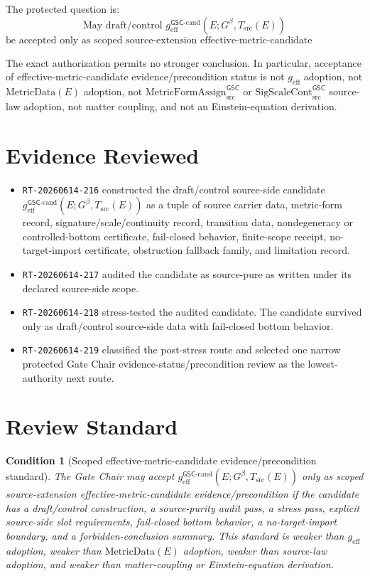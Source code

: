 \documentclass[11pt]{article}
\newcommand{\Gbeta}{G^\beta}
\newcommand{\SigScaleCont}{\mathrm{SigScaleCont}^{\mathsf{GSC}}_{\mathrm{src}}}
\newcommand{\MetricFormAssign}{\mathrm{MetricFormAssign}^{\mathsf{GSC}}_{\mathrm{src}}}
\newcommand{\geff}{g_{\mathrm{eff}}}
\newcommand{\geffCand}{g_{\mathrm{eff}}^{\mathsf{GSC}\mbox{-}\mathrm{cand}}}
\newtheorem{condition}{Condition}
\begin{document}
The protected question is:
\[
\text{May draft/control }\geffCand(E;\Gbeta,T_{\mathrm{src}}(E))
\]
\[
\text{be accepted only as scoped source-extension effective-metric-candidate evidence/precondition?}
\]

The exact authorization permits no stronger conclusion. In particular,
acceptance of effective-metric-candidate evidence/precondition status is not
\(\geff\) adoption, not \(\mathrm{MetricData}(E)\) adoption, not
\(\MetricFormAssign\) or \(\SigScaleCont\) source-law adoption, not matter
coupling, and not an Einstein-equation derivation.

\section{Evidence Reviewed}

\begin{itemize}[leftmargin=*]
  \item \texttt{RT-20260614-216} constructed the draft/control source-side
  candidate \(\geffCand(E;\Gbeta,T_{\mathrm{src}}(E))\) as a tuple of source
  carrier data, metric-form record, signature/scale/continuity record,
  transition data, nondegeneracy or controlled-bottom certificate,
  fail-closed behavior, finite-scope receipt, no-target-import certificate,
  obstruction fallback family, and limitation record.
  \item \texttt{RT-20260614-217} audited the candidate as source-pure as
  written under its declared source-side scope.
  \item \texttt{RT-20260614-218} stress-tested the audited candidate. The
  candidate survived only as draft/control source-side data with fail-closed
  bottom behavior.
  \item \texttt{RT-20260614-219} classified the post-stress route and selected
  one narrow protected Gate Chair evidence-status/precondition review as the
  lowest-authority next route.
\end{itemize}

\section{Review Standard}

\begin{condition}[Scoped effective-metric-candidate evidence/precondition standard]
The Gate Chair may accept \(\geffCand(E;\Gbeta,T_{\mathrm{src}}(E))\) only as
scoped source-extension effective-metric-candidate evidence/precondition if
the candidate has a draft/control construction, a source-purity audit pass, a
stress pass, explicit source-side slot requirements, fail-closed bottom
behavior, a no-target-import boundary, and a forbidden-conclusion summary.
This standard is weaker than \(\geff\) adoption, weaker than
\(\mathrm{MetricData}(E)\) adoption, weaker than source-law adoption, and
weaker than matter-coupling or Einstein-equation derivation.
\end{condition}
\end{document}
